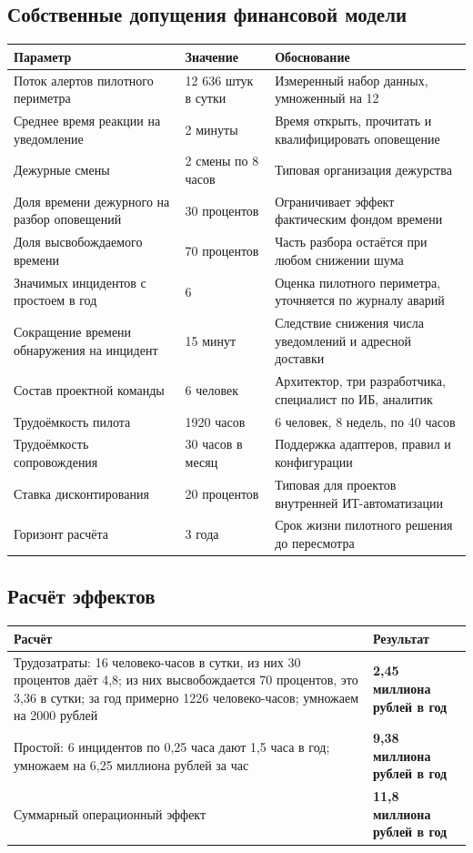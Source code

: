 \documentclass[11pt]{article}
\begin{document}
\subsection{Собственные допущения финансовой модели}
\begin{longtable}{|L{6.4cm}|L{3cm}|L{6.8cm}|}
\hline
\textbf{Параметр} & \textbf{Значение} & \textbf{Обоснование} \\ \hline
Поток алертов пилотного периметра & 12 636 штук в сутки & Измеренный набор данных, умноженный на 12 \\ \hline
Среднее время реакции на уведомление & 2 минуты & Время открыть, прочитать и квалифицировать оповещение \\ \hline
Дежурные смены & 2 смены по 8 часов & Типовая организация дежурства \\ \hline
Доля времени дежурного на разбор оповещений & 30 процентов & Ограничивает эффект фактическим фондом времени \\ \hline
Доля высвобождаемого времени & 70 процентов & Часть разбора остаётся при любом снижении шума \\ \hline
Значимых инцидентов с простоем в год & 6 & Оценка пилотного периметра, уточняется по журналу аварий \\ \hline
Сокращение времени обнаружения на инцидент & 15 минут & Следствие снижения числа уведомлений и адресной доставки \\ \hline
Состав проектной команды & 6 человек & Архитектор, три разработчика, специалист по ИБ, аналитик \\ \hline
Трудоёмкость пилота & 1920 часов & 6 человек, 8 недель, по 40 часов \\ \hline
Трудоёмкость сопровождения & 30 часов в месяц & Поддержка адаптеров, правил и конфигурации \\ \hline
Ставка дисконтирования & 20 процентов & Типовая для проектов внутренней ИТ-автоматизации \\ \hline
Горизонт расчёта & 3 года & Срок жизни пилотного решения до пересмотра \\ \hline
\end{longtable}

\subsection{Расчёт эффектов}
\begin{longtable}{|L{10.4cm}|L{6cm}|}
\hline
\textbf{Расчёт} & \textbf{Результат} \\ \hline
Трудозатраты: 16 человеко-часов в сутки, из них 30 процентов даёт 4,8; из них высвобождается 70 процентов, это 3,36 в сутки; за год примерно 1226 человеко-часов; умножаем на 2000 рублей & \textbf{2,45 миллиона рублей в год} \\ \hline
Простой: 6 инцидентов по 0,25 часа дают 1,5 часа в год; умножаем на 6,25 миллиона рублей за час & \textbf{9,38 миллиона рублей в год} \\ \hline
Суммарный операционный эффект & \textbf{11,8 миллиона рублей в год} \\ \hline
\end{longtable}
\end{document}
